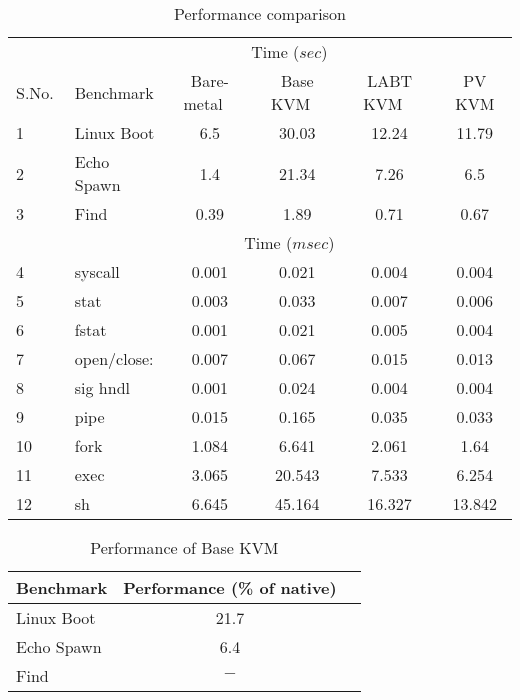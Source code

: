 \documentclass[10pt,twocolumn]{article}
\begin{document}
\begin{table*}
\centering
\caption{Performance comparison}
      \begin{tabular}{|l | l| c c c c|} \hline
     & \multicolumn{5}{c}{Time ($sec$)}\\  
      S.No.\verb, ,&  Benchmark\verb, ,  & Bare-metal \verb, ,& Base KVM \verb, , & LABT KVM \verb, ,& PV KVM \\ \hline
      1&  Linux Boot & 6.5	& 30.03	& 12.24	& 11.79 \\
      2& Echo Spawn	& 1.4	& 21.34 &	7.26 &	6.5 \\
      3& Find	& 0.39	& 1.89	& 0.71	& 0.67 \\ \hline
	   & \multicolumn{5}{c}{Time ($msec$)}\\  \hline

  4& syscall	&	0.001	&	0.021	&	0.004	&	0.004	\\
5&stat	&	0.003	&	0.033	&	0.007	&	0.006	\\
6&fstat	&	0.001	&	0.021	&	0.005	&	0.004	\\
7&open/close:	&	0.007	&	0.067	&	0.015	&	0.013	\\
8&sig hndl	&	0.001	&	0.024	&	0.004	&	0.004	\\
9&pipe 	&	0.015	&	0.165	&	0.035	&	0.033	\\
10&fork	&	1.084	&	6.641	&	2.061	&	1.64	\\
11&exec	&	3.065	&	20.543	&	7.533	&	6.254	\\
12&sh	&	6.645	&	45.164	&	16.327	&	13.842	\\

        \hline
      \end{tabular}
\label{tab:lpGMKLsmall}
\end{table*} 
\begin{table}[!b]
\centering
\caption{Performance of Base KVM}
     \begin{tabular}{lcc} \hline
       Benchmark  & Performance (\% of native) \\ \hline
       Linux Boot & 21.7 \\
       Echo Spawn & 6.4 \\
       Find & ${-}$ \\
       \hline
     \end{tabular}
\label{tab:PerfBase}
\end{table}
\end{document}
